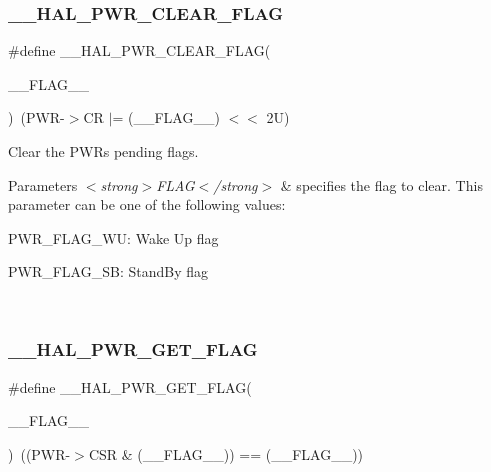 \subsubsection{\texorpdfstring{\+\_\+\+\_\+\+H\+A\+L\+\_\+\+P\+W\+R\+\_\+\+C\+L\+E\+A\+R\+\_\+\+F\+L\+AG}{\_\_HAL\_PWR\_CLEAR\_FLAG}}
{\footnotesize\ttfamily \#define \+\_\+\+\_\+\+H\+A\+L\+\_\+\+P\+W\+R\+\_\+\+C\+L\+E\+A\+R\+\_\+\+F\+L\+AG(\begin{DoxyParamCaption}\item[{}]{\+\_\+\+\_\+\+F\+L\+A\+G\+\_\+\+\_\+ }\end{DoxyParamCaption})~(P\+WR-\/$>$CR $\vert$=  (\+\_\+\+\_\+\+F\+L\+A\+G\+\_\+\+\_\+) $<$$<$ 2\+U)}



Clear the P\+WR\textquotesingle{}s pending flags. 


\begin{DoxyParams}{Parameters}
{\em $<$strong$>$\+F\+L\+A\+G$<$/strong$>$} & specifies the flag to clear. This parameter can be one of the following values\+: \begin{DoxyItemize}
\item P\+W\+R\+\_\+\+F\+L\+A\+G\+\_\+\+WU\+: Wake Up flag \item P\+W\+R\+\_\+\+F\+L\+A\+G\+\_\+\+SB\+: Stand\+By flag \end{DoxyItemize}
\\
\hline
\end{DoxyParams}
\mbox{\label{group___p_w_r___exported___macro_ga2977135bbea35b786805eea640d1c884}} 
\subsubsection{\texorpdfstring{\+\_\+\+\_\+\+H\+A\+L\+\_\+\+P\+W\+R\+\_\+\+G\+E\+T\+\_\+\+F\+L\+AG}{\_\_HAL\_PWR\_GET\_FLAG}}
{\footnotesize\ttfamily \#define \+\_\+\+\_\+\+H\+A\+L\+\_\+\+P\+W\+R\+\_\+\+G\+E\+T\+\_\+\+F\+L\+AG(\begin{DoxyParamCaption}\item[{}]{\+\_\+\+\_\+\+F\+L\+A\+G\+\_\+\+\_\+ }\end{DoxyParamCaption})~((P\+WR-\/$>$C\+SR \& (\+\_\+\+\_\+\+F\+L\+A\+G\+\_\+\+\_\+)) == (\+\_\+\+\_\+\+F\+L\+A\+G\+\_\+\+\_\+))}




